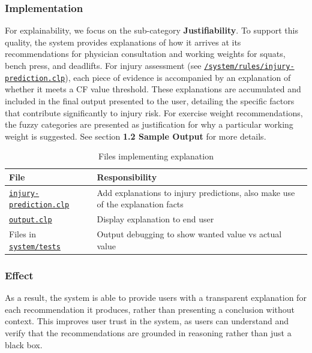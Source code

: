 \documentclass{article}
\begin{document}
\subsubsection{Implementation}
For explainability, we focus on the sub-category \textbf{Justifiability}. To support this quality, the system provides explanations of how it arrives at its recommendations for physician consultation and working weights for squats, bench press, and deadlifts.
For injury assessment (see \href{https://github.com/joshpham97/COMP474Project_OptionB_PhamTran_ExerciseRecommender/blob/main/system/rules/injury-prediction.clp#L9-L83}{\texttt{/system/rules/injury-prediction.clp}}), each piece of evidence is accompanied by an explanation of whether it meets a CF value threshold. These explanations are accumulated and included in the final output presented to the user, detailing the specific factors that contribute significantly to injury risk. For exercise weight recommendations, the fuzzy categories are presented as justification for why a particular working weight is suggested. See section \textbf{1.2 Sample Output} for more details.

\begin{table}
\centering
\begin{tabular}{|l|l|}\hline
\textbf{File}& \textbf{Responsibility}\\\hline
\href{https://github.com/joshpham97/COMP474Project_OptionB_PhamTran_ExerciseRecommender/blob/main/system/rules/injury-prediction.clp#L110-L115}{\texttt{injury-prediction.clp}}& Add explanations to injury predictions, also make use of the explanation facts\\ \hline
\href{https://github.com/joshpham97/COMP474Project_OptionB_PhamTran_ExerciseRecommender/blob/main/system/output.clp}{\texttt{output.clp}}& Display explanation to end user\\
\hline
Files in \href{https://github.com/joshpham97/COMP474Project_OptionB_PhamTran_ExerciseRecommender/tree/main/system/tests}{\texttt{system/tests}}&Output debugging to show wanted value vs actual value\\ \hline
\end{tabular}
\caption{Files implementing explanation}
\label{tab:placeholder}
\end{table}
\subsubsection{Effect}
As a result, the system is able to provide users with a transparent explanation for each recommendation it produces, rather than presenting a conclusion without context. This improves user trust in the system, as users can understand and verify that the recommendations are grounded in reasoning rather than just a black box.
\end{document}
